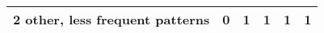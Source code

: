 \documentclass[]{book}
\begin{document}
\begin{longtable}[]{@{}cccccc@{}}
\begin{minipage}[t]{0.28\columnwidth}
2 other, less frequent patterns\strut
\end{minipage} & \begin{minipage}[t]{0.07\columnwidth}\centering\strut
0\strut
\end{minipage} & \begin{minipage}[t]{0.12\columnwidth}\centering\strut
1\strut
\end{minipage} & \begin{minipage}[t]{0.12\columnwidth}\centering\strut
1\strut
\end{minipage} & \begin{minipage}[t]{0.12\columnwidth}\centering\strut
1\strut
\end{minipage} & \begin{minipage}[t]{0.12\columnwidth}\centering\strut
1\strut
\end{minipage}\tabularnewline
\bottomrule
\end{longtable}
\end{document}
